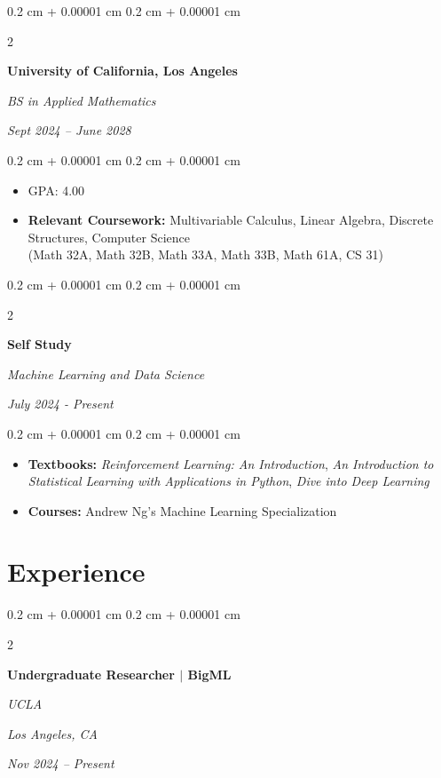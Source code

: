 \documentclass[10pt, letterpaper]{article}
\newenvironment{highlights}{
    \begin{itemize}[
        topsep=0.10 cm,
        parsep=0.10 cm,
        partopsep=0pt,
        itemsep=0pt,
        leftmargin=0.4 cm + 10pt
    ]
}{
    \end{itemize}
} %
\newenvironment{onecolentry}{
    \begin{adjustwidth}{
        0.2 cm + 0.00001 cm
    }{
        0.2 cm + 0.00001 cm
    }
}{
    \end{adjustwidth}
} %
\newenvironment{twocolentry}[2][]{
    \onecolentry
    \def\secondColumn{#2}
    \setcolumnwidth{\fill, 4.5 cm}
    \begin{paracol}{2}
}{
    \switchcolumn \raggedleft \secondColumn
    \end{paracol}
    \endonecolentry
} %
\let\hrefWithoutArrow\href
\renewcommand{\href}[2]{\hrefWithoutArrow{#1}{\ifthenelse{\equal{#2}{}}{ }{#2 }\raisebox{.15ex}{\footnotesize \faExternalLink*}}}
\begin{document}
        
        \begin{twocolentry}{
            
            
        \textit{Sept 2024 – June 2028}}
            \textbf{University of California, Los Angeles}

            \textit{BS in Applied Mathematics}
        \end{twocolentry}

        \vspace{0.10 cm}
        \begin{onecolentry}
            \begin{highlights}
                \item GPA: 4.00 %
                \item \textbf{Relevant Coursework:}  Multivariable Calculus, Linear Algebra, Discrete Structures, Computer Science \\ (Math 32A, Math 32B, Math 33A, Math 33B, Math 61A, CS 31)
            \end{highlights}
        \end{onecolentry}

        \vspace{0.2 cm}
        
        \begin{twocolentry}{
            
            
        \textit{July 2024 - Present}}
            \textbf{Self Study}

            \textit{Machine Learning and Data Science}
        \end{twocolentry}

        \vspace{0.10 cm}
        \begin{onecolentry}
            \begin{highlights}
                \item \textbf{Textbooks:}  \textit {Reinforcement Learning:
An Introduction}, \textit {An Introduction to Statistical Learning with Applications in Python}, \textit{Dive into Deep Learning} 
            \item 
            \textbf{Courses:}  Andrew Ng's Machine Learning Specialization

            \end{highlights}
        \end{onecolentry}



    
    \section{Experience}
        \begin{twocolentry}{
        \textit{Los Angeles, CA}    
            
        \textit{Nov 2024 – Present}}
            \textbf{Undergraduate Researcher $|$ BigML}
            
            \textit{UCLA}
        \end{twocolentry}
\end{document}
